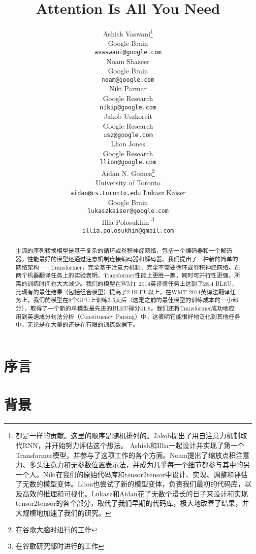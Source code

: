 \documentclass{article}
\title{Attention Is All You Need}
\author{
  \AND
  Ashish Vaswani\thanks{都是一样的贡献。这里的顺序是随机排列的。Jakob提出了用自注意力机制取代RNN，并开始努力评估这个想法。
  Ashish和Illia一起设计并实现了第一个Transformer模型，并参与了这项工作的各个方面。Noam提出了缩放点积注意力、多头注意力和无参数位置表示法，并成为几乎每一个细节都参与其中的另一个人。Niki在我们的原始代码库和tensor2tensor中设计、实现、调整和评估了无数的模型变体。Llion也尝试了新的模型变体，负责我们最初的代码库，以及高效的推理和可视化。Lukasz和Aidan花了无数个漫长的日子来设计和实现tensor2tensor的各个部分，取代了我们早期的代码库，极大地改善了结果，并大规模地加速了我们的研究。
}\\
  Google Brain\\
  \texttt{avaswani@google.com}\\
  \And
  Noam Shazeer\footnotemark[1]\\
  Google Brain\\
  \texttt{noam@google.com}\\
  \And
  Niki Parmar\footnotemark[1]\\
  Google Research\\
  \texttt{nikip@google.com}\\  
  \And
  Jakob Uszkoreit\footnotemark[1]\\
  Google Research\\
  \texttt{usz@google.com}\\
  \And  
  Llion Jones\footnotemark[1]\\
  Google Research\\
  \texttt{llion@google.com}\\   
  \And
  Aidan N. Gomez\footnotemark[1] \hspace{1.7mm}\thanks{在谷歌大脑时进行的工作}\\
  University of Toronto\\
  \texttt{aidan@cs.toronto.edu}
  \And
  {\L}ukasz Kaiser\footnotemark[1]\\
  Google Brain\\
  \texttt{lukaszkaiser@google.com}\\
  \And
  Illia Polosukhin\footnotemark[1]\hspace{1.7mm} \thanks{在谷歌研究部时进行的工作}\\
  \texttt{illia.polosukhin@gmail.com}\\  
}
\begin{document}
\maketitle

\begin{abstract}
主流的序列转换模型是基于复杂的循环或卷积神经网络，包括一个编码器和一个解码器。性能最好的模型还通过注意机制连接编码器和解码器。我们提出了一种新的简单的网络架构——Transformer，完全基于注意力机制，完全不需要循环或卷积神经网络。在两个机器翻译任务上的实验表明，Transformer性能上更胜一筹，同时可并行性更强，所需的训练时间也大大减少。我们的模型在WMT 2014英译德任务上达到了28.4 BLEU，比现有的最佳结果（包括组合模型）提高了2 BLEU以上。在WMT 2014英译法翻译任务上，我们的模型在8个GPU上训练3.5天后（这是之前的最佳模型的训练成本的一小部分），取得了一个新的单模型最先进的BLEU得分41.8。我们还将Transformer成功地应用到英语成分句法分析（Constituency Parsing）中，这表明它能很好地泛化到其他任务中，无论是在大量的还是在有限的训练数据下。



\end{abstract}

\section{序言}



\section{背景}
\end{document}
